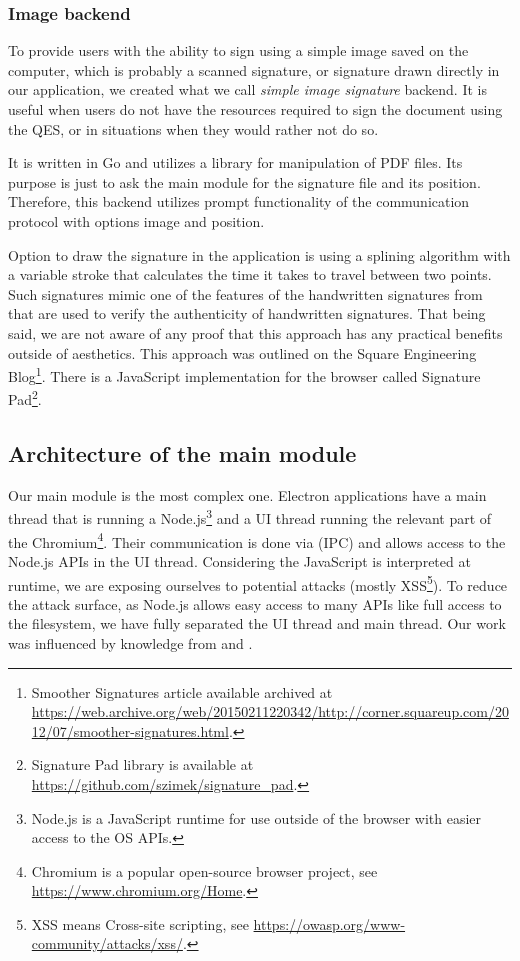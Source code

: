 \documentclass[thesismargins, english, thesislinespacing, onelinechapterstyle, upjsfrontpage]{rnthesis}
\begin{document}
\subsubsection{Image backend}

To provide users with the ability to sign using a simple image saved on the computer, which is probably a scanned signature, or signature drawn directly in our application, we created what we call \textit{simple image signature} backend.
It is useful when users do not have the resources required to sign the document using the QES, or in situations when they would rather not do so.

It is written in Go and utilizes a library for manipulation of PDF files.
Its purpose is just to ask the main module for the signature file and its position.
Therefore, this backend utilizes prompt functionality of the communication protocol with options image and position.

Option to draw the signature in the application is using a splining algorithm with a variable stroke that calculates the time it takes to travel between two points.
Such signatures mimic one of the features of the handwritten signatures from \cite{verification} that are used to verify the authenticity of handwritten signatures.
That being said, we are not aware of any proof that this approach has any practical benefits outside of aesthetics.
This approach was outlined on the Square Engineering Blog\footnote{Smoother Signatures article available archived at \url{https://web.archive.org/web/20150211220342/http://corner.squareup.com/2012/07/smoother-signatures.html}.}.
There is a JavaScript implementation for the browser called Signature Pad\footnote{Signature Pad library is available at \url{https://github.com/szimek/signature_pad}.}.

\subsection{Architecture of the main module} \label{architecture}

Our main module is the most complex one.
Electron applications have a main thread that is running a Node.js\footnote{Node.js is a JavaScript runtime for use outside of the browser with easier access to the OS APIs.} and a UI thread running the relevant part of the Chromium\footnote{Chromium is a popular open-source browser project, see \url{https://www.chromium.org/Home}.}.
Their communication is done via  (IPC) and allows access to the Node.js APIs in the UI thread.
Considering the JavaScript is interpreted at runtime, we are exposing ourselves to potential attacks (mostly XSS\footnote{XSS means Cross-site scripting, see \url{https://owasp.org/www-community/attacks/xss/}.}).
To reduce the attack surface, as Node.js allows easy access to many APIs like full access to the filesystem, we have fully separated the UI thread and main thread.
Our work was influenced by knowledge from \cite{eloquentjs} and \cite{ydkjs}.
\end{document}
